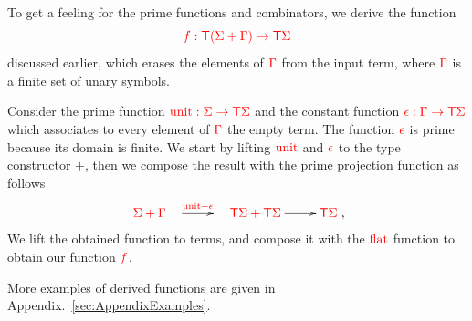 

\noindent\begin{example}\label{ex:filter} 
 To get a feeling for the prime functions and combinators, we derive the function
$$ {\color{red}{f:{\color{red}{\mathsf T}}({\color{red}{\Sigma}}+{\color{red}{\Gamma}})\to{\color{red}{\mathsf T}}{\color{red}{\Sigma}}}}$$
discussed earlier, which erases the elements of ${\color{red}{\Gamma}}$ from the input term, where ${\color{red}{\Gamma}}$ is a finite set of unary symbols. 

Consider the prime function ${\color{red}{{\color{red}{\mathrm{unit}}}:{\color{red}{\Sigma}}\to{\color{red}{\mathsf T}}{\color{red}{\Sigma}}}}$ and the constant function ${\color{red}{\epsilon:{\color{red}{\Gamma}}\to{\color{red}{\mathsf T}}{\color{red}{\Sigma}}}}$ which associates to every element of ${\color{red}{\Gamma}}$ the empty term. The function ${\color{red}{\epsilon}}$ is prime because its domain is finite. We start by lifting ${\color{red}{{\color{red}{\mathrm{unit}}}}}$ and ${\color{red}{\epsilon}}$ to the type constructor $+$, then we compose the result with the prime projection function as follows
\begin{align*}
\xymatrix{
    \ranked{\rSigma+\rGamma}\quad \ar[r]^-{\ranked{\unit+\epsilon}} & \quad \ranked{\tmonad\rSigma+\tmonad\rSigma}\ar[r]^-{} &\tmonad\rSigma
},
\end{align*}
We lift the obtained function to terms, and compose it with the ${\color{red}{\mathrm{flat}}}$ function to obtain our function ${\color{red}{f}}$.  
\end{example}

More examples of derived functions are given in Appendix.~\ref{sec:AppendixExamples}.